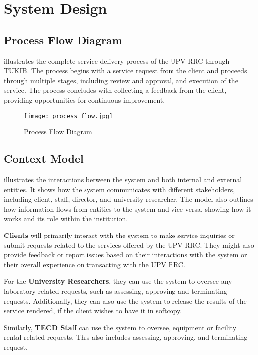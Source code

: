 \section{System Design}

\subsection{Process Flow Diagram}

 illustrates the complete service delivery process of the UPV RRC through TUKIB. The process begins with a service request from the client and proceeds through multiple stages, including review and approval, and execution of the service. The process concludes with collecting a feedback from the client, providing opportunities for continuous improvement.

\begin{figure}[h]
	\centering 
	\texttt{[image: process\_flow.jpg]}
	\caption{Process Flow Diagram}
	\label{fig:process_flow}
\end{figure}

\subsection{Context Model}

 illustrates the interactions between the system and both internal and external entities. It shows how the system communicates with different stakeholders, including client, staff, director, and university researcher. The model also outlines how information flows from entities to the system and vice versa, showing how it works and its role within the institution.

\textbf{Clients} will primarily interact with the system to make service inquiries or submit requests related to the services offered by the UPV RRC. They might also provide feedback or report issues based on their interactions with the system or their overall experience on transacting with the UPV RRC.

For the \textbf{University Researchers}, they can use the system to oversee any laboratory-related requests, such as assessing, approving and terminating requests. Additionally, they can also use the system to release the results of the service rendered, if the client wishes to have it in softcopy. 

Similarly, \textbf{TECD Staff} can use the system to oversee, equipment or facility rental related requests. This also includes assessing, approving, and terminating request. 

